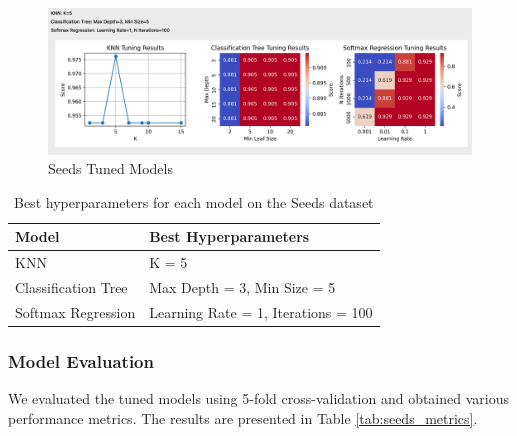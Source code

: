 \documentclass[letterpaper,10pt]{article}
\begin{document}
\begin{figure}[ht]
    \centering
    \includegraphics[width=1.0\textwidth]{seeds_tuned.png}
    \caption{Seeds Tuned Models}
    \label{seeds_tuned}
\end{figure}
\begin{table}[ht]
\centering
\caption{Best hyperparameters for each model on the Seeds dataset}
\label{tab:seeds_tuning}
\begin{tabular}{|l|l|}
\hline
\textbf{Model} & \textbf{Best Hyperparameters} \\
\hline
KNN & K = 5 \\
\hline
Classification Tree & Max Depth = 3, Min Size = 5 \\
\hline
Softmax Regression & Learning Rate = 1, Iterations = 100 \\
\hline
\end{tabular}
\end{table}

\subsubsection{Model Evaluation}

We evaluated the tuned models using 5-fold cross-validation and obtained various performance metrics. The results are presented in Table \ref{tab:seeds_metrics}.
\end{document}
